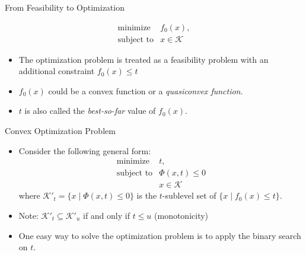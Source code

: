\documentclass[
  ignorenonframetext,
  aspectratio=169,
  serif,onlymath]{beamer}
\begin{document}
\begin{frame}{From Feasibility to Optimization}
\protect\hypertarget{from-feasibility-to-optimization}{}

\[\begin{array}{ll}
    \text{minimize}     & f_0(x), \\
    \text{subject to}   & x \in \mathcal{K}
\end{array}\]

\begin{itemize}
\item
  The optimization problem is treated as a feasibility problem with an
  additional constraint \(f_0(x) \le t\)
\item
  \(f_0(x)\) could be a convex function or a \emph{quasiconvex
  function}.
\item
  \(t\) is also called the \emph{best-so-far} value of \(f_0(x)\).
\end{itemize}

\end{frame}

\begin{frame}{Convex Optimization Problem}
\protect\hypertarget{convex-optimization-problem}{}

\begin{itemize}
\item
  Consider the following general form: \[\begin{array}{ll}
              \text{minimize}         & t, \\
              \text{subject to}   & \Phi(x, t) \le 0 \\
                                  & x \in \mathcal{K}
    \end{array}\] where \(\mathcal{K}'_t = \{x \mid \Phi(x, t) \le 0\}\)
  is the \(t\)-sublevel set of \(\{x \mid f_0(x) \le t\}\).
\item
  Note: \(\mathcal{K'}_t \subseteq \mathcal{K'}_u\) if and only if
  \(t \le u\) (monotonicity)
\item
  One easy way to solve the optimization problem is to apply the binary
  search on \(t\).
\end{itemize}

\end{frame}
\end{document}
